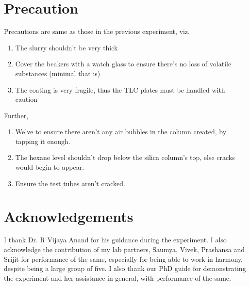 \section{Precaution}
	Precautions are same as those in the previous experiment, viz.
	\begin{enumerate}
		\item The slurry shouldn't be very thick
		\item Cover the beakers with a watch glass to ensure there's no loss of volatile substances (minimal that is)
		\item The coating is very fragile, thus the TLC plates must be handled with caution
	\end{enumerate}	
	Further,
	\begin{enumerate}
		\item We've to ensure there aren't any air bubbles in the column created, by tapping it enough.
		\item The hexane level shouldn't drop below the silica column's top, else cracks would begin to appear.
		\item Ensure the test tubes aren't cracked. 
	\end{enumerate}
\section{Acknowledgements}
I thank Dr. R Vijaya Anand for his guidance during the experiment. I also acknowledge the contribution of my lab partners, Saumya, Vivek, Prashansa and Srijit for performance of the same, especially for being able to work in harmony, despite being a large group of five. I also thank our PhD guide for demonstrating the experiment and her assistance in general, with performance of the same.